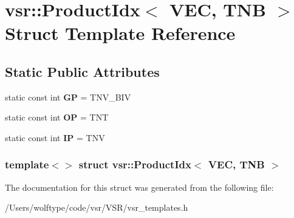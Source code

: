 \hypertarget{structvsr_1_1_product_idx_3_01_v_e_c_00_01_t_n_b_01_4}{\section{vsr\-:\-:Product\-Idx$<$ V\-E\-C, T\-N\-B $>$ Struct Template Reference}
\label{structvsr_1_1_product_idx_3_01_v_e_c_00_01_t_n_b_01_4}
}
\subsection*{Static Public Attributes}
\begin{DoxyCompactItemize}
\item 
\hypertarget{structvsr_1_1_product_idx_3_01_v_e_c_00_01_t_n_b_01_4_ae8a68dc9c0841375d9f177153b951230}{static const int {\bfseries G\-P} = T\-N\-V\-\_\-\-B\-I\-V}\label{structvsr_1_1_product_idx_3_01_v_e_c_00_01_t_n_b_01_4_ae8a68dc9c0841375d9f177153b951230}

\item 
\hypertarget{structvsr_1_1_product_idx_3_01_v_e_c_00_01_t_n_b_01_4_af023d933792fdd184dbb5c05a5e3e7f3}{static const int {\bfseries O\-P} = T\-N\-T}\label{structvsr_1_1_product_idx_3_01_v_e_c_00_01_t_n_b_01_4_af023d933792fdd184dbb5c05a5e3e7f3}

\item 
\hypertarget{structvsr_1_1_product_idx_3_01_v_e_c_00_01_t_n_b_01_4_af8a821e4f09484636c92db20bbdd1535}{static const int {\bfseries I\-P} = T\-N\-V}\label{structvsr_1_1_product_idx_3_01_v_e_c_00_01_t_n_b_01_4_af8a821e4f09484636c92db20bbdd1535}

\end{DoxyCompactItemize}
\subsubsection*{template$<$$>$ struct vsr\-::\-Product\-Idx$<$ V\-E\-C, T\-N\-B $>$}



The documentation for this struct was generated from the following file\-:\begin{DoxyCompactItemize}
\item 
/\-Users/wolftype/code/vsr/\-V\-S\-R/vsr\-\_\-templates.\-h\end{DoxyCompactItemize}
